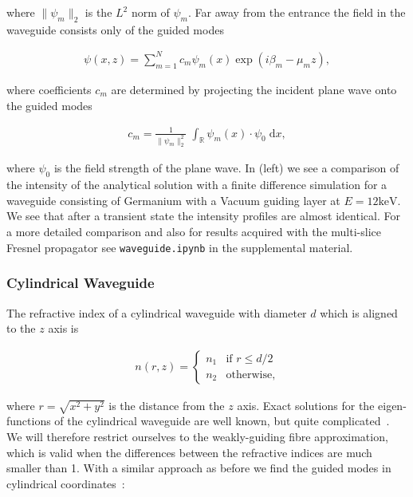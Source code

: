 where $\lVert \psi_m \rVert_2$ is the $L^2$ norm of $\psi_m$. Far away from the entrance the field in the waveguide consists only of the guided modes

\begin{align*}
    \psi(x,z) = \sum_{m=1}^{N} c_m \psi_m(x) \exp( i \beta_m - \mu_m z),
\end{align*}

where coefficients $c_m$ are determined by projecting the incident plane wave onto the guided modes

\begin{align*}
    c_m = \frac{1}{\lVert \psi_m \rVert_2^2} \; \int_\mathbb{R} \psi_m(x) \cdot \psi_0 \; \text{d}x,
\end{align*}

where $\psi_0$ is the field strength of the plane wave. In  (left) we see a comparison of the intensity of the analytical solution with a finite difference simulation for a waveguide consisting of Germanium with a Vacuum guiding layer at $E = 12\text{keV}$. We see that after a transient state the intensity profiles are almost identical. For a more detailed comparison and also for results acquired with the multi-slice Fresnel propagator see \lstinline{waveguide.ipynb} in the supplemental material.


\subsubsection{Cylindrical Waveguide}

The refractive index of a cylindrical waveguide with diameter $d$ which is aligned to the $z$ axis is

\begin{align*}
    n(r,z) = 
    \begin{cases}
    n_1 & \text{if } r \le d/2\\
    n_2 & \text{otherwise,}
    \end{cases}
\end{align*}

where $r = \sqrt{x^2+y^2}$ is the distance from the $z$ axis. Exact solutions for the eigen-functions of the cylindrical waveguide are well known, but quite complicated~\cite{DissertationFuhse}. We will therefore restrict ourselves to the weakly-guiding fibre approximation, which is valid when the differences between the refractive indices are much smaller than 1. With a similar approach as before we find the guided modes in cylindrical coordinates~\cite{DissertationFuhse}:

